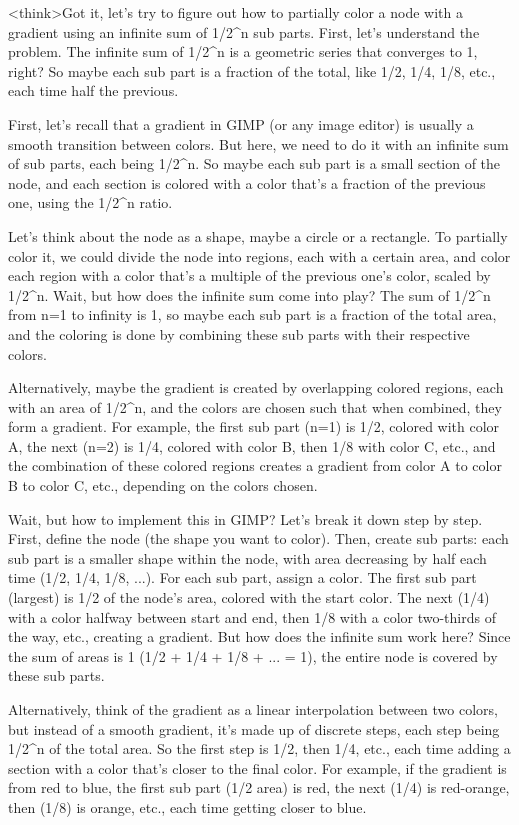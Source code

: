 <think>Got it, let's try to figure out how to partially color a node with a gradient using an infinite sum of 1/2^n sub parts. First, let's understand the problem. The infinite sum of 1/2^n is a geometric series that converges to 1, right? So maybe each sub part is a fraction of the total, like 1/2, 1/4, 1/8, etc., each time half the previous. 

First, let's recall that a gradient in GIMP (or any image editor) is usually a smooth transition between colors. But here, we need to do it with an infinite sum of sub parts, each being 1/2^n. So maybe each sub part is a small section of the node, and each section is colored with a color that's a fraction of the previous one, using the 1/2^n ratio. 

Let's think about the node as a shape, maybe a circle or a rectangle. To partially color it, we could divide the node into regions, each with a certain area, and color each region with a color that's a multiple of the previous one's color, scaled by 1/2^n. Wait, but how does the infinite sum come into play? The sum of 1/2^n from n=1 to infinity is 1, so maybe each sub part is a fraction of the total area, and the coloring is done by combining these sub parts with their respective colors. 

Alternatively, maybe the gradient is created by overlapping colored regions, each with an area of 1/2^n, and the colors are chosen such that when combined, they form a gradient. For example, the first sub part (n=1) is 1/2, colored with color A, the next (n=2) is 1/4, colored with color B, then 1/8 with color C, etc., and the combination of these colored regions creates a gradient from color A to color B to color C, etc., depending on the colors chosen. 

Wait, but how to implement this in GIMP? Let's break it down step by step. First, define the node (the shape you want to color). Then, create sub parts: each sub part is a smaller shape within the node, with area decreasing by half each time (1/2, 1/4, 1/8, ...). For each sub part, assign a color. The first sub part (largest) is 1/2 of the node's area, colored with the start color. The next (1/4) with a color halfway between start and end, then 1/8 with a color two-thirds of the way, etc., creating a gradient. But how does the infinite sum work here? Since the sum of areas is 1 (1/2 + 1/4 + 1/8 + ... = 1), the entire node is covered by these sub parts. 

Alternatively, think of the gradient as a linear interpolation between two colors, but instead of a smooth gradient, it's made up of discrete steps, each step being 1/2^n of the total area. So the first step is 1/2, then 1/4, etc., each time adding a section with a color that's closer to the final color. For example, if the gradient is from red to blue, the first sub part (1/2 area) is red, the next (1/4) is red-orange, then (1/8) is orange, etc., each time getting closer to blue. 

